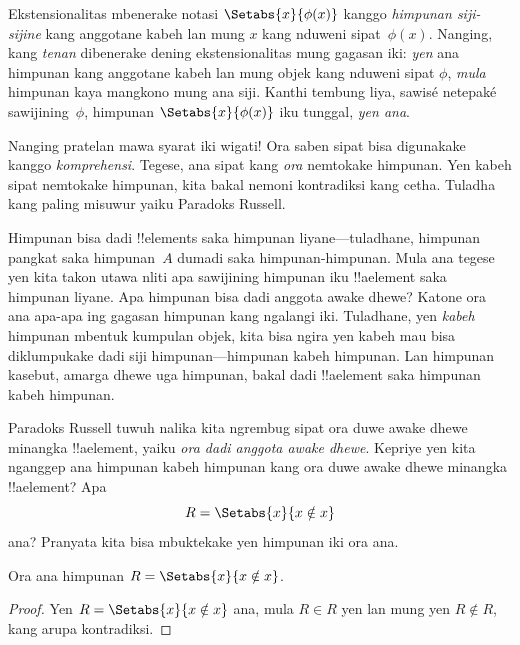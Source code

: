 \documentclass[../../../include/open-logic-section]{subfiles}
\begin{document}

Ekstensionalitas mbenerake notasi $\Setabs{x}{\phi(x)}$ kanggo
\emph{himpunan siji-sijine} kang anggotane kabeh lan mung $x$ kang
nduweni sipat~$\phi(x)$.
Nanging, kang \emph{tenan} dibenerake dening ekstensionalitas
mung gagasan iki: \emph{yen} ana himpunan kang anggotane kabeh
lan mung objek kang nduweni sipat $\phi$, \emph{mula} himpunan
kaya mangkono mung ana siji. Kanthi tembung liya, sawisé netepaké
sawijining~$\phi$, himpunan $\Setabs{x}{\phi(x)}$ iku tunggal,
\emph{yen ana}.

Nanging pratelan mawa syarat iki wigati!{} Ora saben sipat
bisa digunakake kanggo \emph{komprehensi}. Tegese, ana sipat
kang \emph{ora} nemtokake himpunan. Yen kabeh sipat nemtokake
himpunan, kita bakal nemoni kontradiksi kang cetha.
Tuladha kang paling misuwur yaiku Paradoks Russell.

Himpunan bisa dadi !!{element}s saka himpunan liyane---tuladhane,
himpunan pangkat saka himpunan~$A$ dumadi saka himpunan-himpunan.
Mula ana tegese yen kita takon utawa nliti apa sawijining
himpunan iku !!a{element} saka himpunan liyane.
Apa himpunan bisa dadi anggota awake dhewe? Katone ora ana
apa-apa ing gagasan himpunan kang ngalangi iki.
Tuladhane, yen \emph{kabeh} himpunan mbentuk kumpulan objek,
kita bisa ngira yen kabeh mau bisa diklumpukake dadi siji
himpunan---himpunan kabeh himpunan. Lan himpunan kasebut,
amarga dhewe uga himpunan, bakal dadi !!a{element}
saka himpunan kabeh himpunan.

Paradoks Russell tuwuh nalika kita ngrembug sipat ora duwe
awake dhewe minangka !!a{element}, yaiku \emph{ora dadi anggota
awake dhewe}. Kepriye yen kita nganggep ana himpunan kabeh
himpunan kang ora duwe awake dhewe minangka !!a{element}?
Apa
\[
R = \Setabs{x}{x \notin x}
\]
ana? Pranyata kita bisa mbuktekake yen himpunan iki ora ana.

\begin{thm}
	Ora ana himpunan $R = \Setabs{x}{x \notin x}$.
\end{thm}

\begin{proof}
Yen $R = \Setabs{x}{x \notin x}$ ana, mula
$R \in R$ yen lan mung yen $R \notin R$, kang arupa kontradiksi.
\end{proof}
\end{document}

